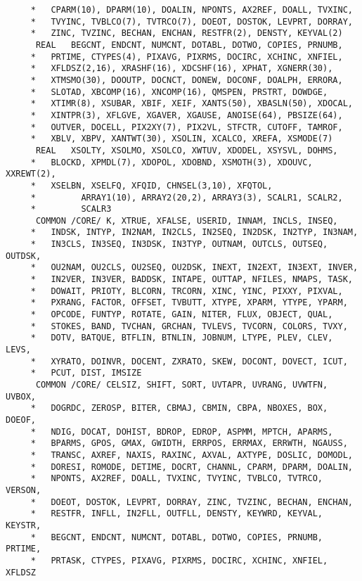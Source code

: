 \begin{verbatim}
     *   CPARM(10), DPARM(10), DOALIN, NPONTS, AX2REF, DOALL, TVXINC,
     *   TVYINC, TVBLCO(7), TVTRCO(7), DOEOT, DOSTOK, LEVPRT, DORRAY,
     *   ZINC, TVZINC, BECHAN, ENCHAN, RESTFR(2), DENSTY, KEYVAL(2)
      REAL   BEGCNT, ENDCNT, NUMCNT, DOTABL, DOTWO, COPIES, PRNUMB,
     *   PRTIME, CTYPES(4), PIXAVG, PIXRMS, DOCIRC, XCHINC, XNFIEL,
     *   XFLDSZ(2,16), XRASHF(16), XDCSHF(16), XPHAT, XGNERR(30),
     *   XTMSMO(30), DOOUTP, DOCNCT, DONEW, DOCONF, DOALPH, ERRORA,
     *   SLOTAD, XBCOMP(16), XNCOMP(16), QMSPEN, PRSTRT, DOWDGE,
     *   XTIMR(8), XSUBAR, XBIF, XEIF, XANTS(50), XBASLN(50), XDOCAL,
     *   XINTPR(3), XFLGVE, XGAVER, XGAUSE, ANOISE(64), PBSIZE(64),
     *   OUTVER, DOCELL, PIX2XY(7), PIX2VL, STFCTR, CUTOFF, TAMROF,
     *   XBLV, XBPV, XANTWT(30), XSOLIN, XCALCO, XREFA, XSMODE(7)
      REAL   XSOLTY, XSOLMO, XSOLCO, XWTUV, XDODEL, XSYSVL, DOHMS,
     *   BLOCKD, XPMDL(7), XDOPOL, XDOBND, XSMOTH(3), XDOUVC, XXREWT(2),
     *   XSELBN, XSELFQ, XFQID, CHNSEL(3,10), XFQTOL,
     *         ARRAY1(10), ARRAY2(20,2), ARRAY3(3), SCALR1, SCALR2,
     *         SCALR3
      COMMON /CORE/ K, XTRUE, XFALSE, USERID, INNAM, INCLS, INSEQ,
     *   INDSK, INTYP, IN2NAM, IN2CLS, IN2SEQ, IN2DSK, IN2TYP, IN3NAM,
     *   IN3CLS, IN3SEQ, IN3DSK, IN3TYP, OUTNAM, OUTCLS, OUTSEQ, OUTDSK,
     *   OU2NAM, OU2CLS, OU2SEQ, OU2DSK, INEXT, IN2EXT, IN3EXT, INVER,
     *   IN2VER, IN3VER, BADDSK, INTAPE, OUTTAP, NFILES, NMAPS, TASK,
     *   DOWAIT, PRIOTY, BLCORN, TRCORN, XINC, YINC, PIXXY, PIXVAL,
     *   PXRANG, FACTOR, OFFSET, TVBUTT, XTYPE, XPARM, YTYPE, YPARM,
     *   OPCODE, FUNTYP, ROTATE, GAIN, NITER, FLUX, OBJECT, QUAL,
     *   STOKES, BAND, TVCHAN, GRCHAN, TVLEVS, TVCORN, COLORS, TVXY,
     *   DOTV, BATQUE, BTFLIN, BTNLIN, JOBNUM, LTYPE, PLEV, CLEV, LEVS,
     *   XYRATO, DOINVR, DOCENT, ZXRATO, SKEW, DOCONT, DOVECT, ICUT,
     *   PCUT, DIST, IMSIZE
      COMMON /CORE/ CELSIZ, SHIFT, SORT, UVTAPR, UVRANG, UVWTFN, UVBOX,
     *   DOGRDC, ZEROSP, BITER, CBMAJ, CBMIN, CBPA, NBOXES, BOX, DOEOF,
     *   NDIG, DOCAT, DOHIST, BDROP, EDROP, ASPMM, MPTCH, APARMS,
     *   BPARMS, GPOS, GMAX, GWIDTH, ERRPOS, ERRMAX, ERRWTH, NGAUSS,
     *   TRANSC, AXREF, NAXIS, RAXINC, AXVAL, AXTYPE, DOSLIC, DOMODL,
     *   DORESI, ROMODE, DETIME, DOCRT, CHANNL, CPARM, DPARM, DOALIN,
     *   NPONTS, AX2REF, DOALL, TVXINC, TVYINC, TVBLCO, TVTRCO, VERSON,
     *   DOEOT, DOSTOK, LEVPRT, DORRAY, ZINC, TVZINC, BECHAN, ENCHAN,
     *   RESTFR, INFLL, IN2FLL, OUTFLL, DENSTY, KEYWRD, KEYVAL, KEYSTR,
     *   BEGCNT, ENDCNT, NUMCNT, DOTABL, DOTWO, COPIES, PRNUMB, PRTIME,
     *   PRTASK, CTYPES, PIXAVG, PIXRMS, DOCIRC, XCHINC, XNFIEL, XFLDSZ

\end{verbatim}
